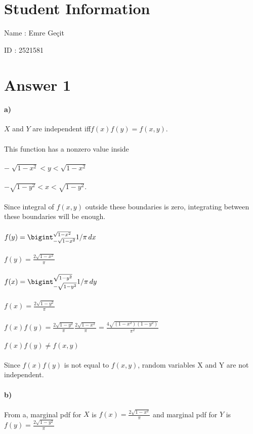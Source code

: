 \documentclass[12pt]{article}
\begin{document}
\section*{Student Information}

Name : Emre Geçit

ID : 2521581


\section*{Answer 1}

\paragraph{a)}

$X$ and $Y$ are independent iff$f(x)f(y) = f(x,y)$.\\\\
This function has a nonzero value inside\\\\
$-\sqrt[]{1-x^2} < y < \sqrt{1-x^2}$\\\\
$-\sqrt{1-y^2} < x < \sqrt{1-y^2}$.\\\\

Since integral of $f(x, y)$ outside these boundaries is zero, integrating between these boundaries will be enough.\\\\
$f(y) = \bigint_{-\sqrt{1-x^2}}^{\sqrt{1-x^2}}  1/\pi\,dx$\\\\
$f(y) = \frac{2\sqrt{1-x^2}}{\pi}$\\\\
$f(x) = \bigint_{-\sqrt{1-y^2}}^{\sqrt{1-y^2}}  1/\pi\,dy$\\\\
$f(x) = \frac{2\sqrt{1-y^2}}{\pi}$\\\\
$f(x)f(y) = \frac{2\sqrt{1-y^2}}{\pi} \frac{2\sqrt{1-x^2}}{\pi} = \frac{4\sqrt{(1-x^2)(1-y^2)}}{\pi^2}$\\\\
$f(x)f(y) \neq f(x,y)$\\\\
Since $f(x)f(y)$ is not equal to $f(x,y)$, random variables X and Y are not independent.
\paragraph{b)}
From a, marginal pdf for $X$ is $f(x) = \frac{2\sqrt{1-x^2}}{\pi}$ and marginal pdf for $Y$ is $f(y) = \frac{2\sqrt{1-y^2}}{\pi}$\\\\
\end{document}
